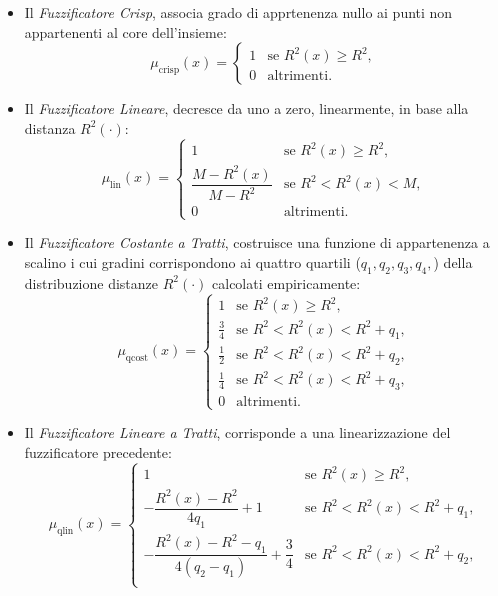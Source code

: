 \documentclass [11pt,a4paper,twoside,openright] {book}
\begin{document}
\begin{itemize}
\item Il \textit{Fuzzificatore Crisp}, associa grado di apprtenenza nullo ai punti non appartenenti al core dell'insieme:
\begin{equation}
\mu_{\mathrm{crisp}}(x)=
\begin{cases}
1 & \text{se } R^2(x) \geq R^2, \\
0 & \text{altrimenti}.
\end{cases}
\end{equation}
\item Il \textit{Fuzzificatore Lineare}, decresce da uno a zero, linearmente, in base alla distanza $R^2(\cdot)$:
\begin{equation}
\mu_{\mathrm{lin}}(x)=
\begin{cases}
1 & \text{se } R^2(x) \geq R^2, \\
\dfrac{M-R^2(x)}{M-R^2} & \text{se } R^2 <  R^2(x) < M, \\
0 & \text{altrimenti}.
\end{cases}
\end{equation}
\item Il \textit{Fuzzificatore Costante a Tratti}, costruisce una funzione di appartenenza a scalino i cui gradini corrispondono ai quattro quartili ($q_1, q_2, q_3, q_4,$) della distribuzione distanze $R^2(\cdot)$ calcolati empiricamente:
\begin{equation}
\mu_{\mathrm{qcost}}(x)=
\begin{cases}
1 & \text{se } R^2(x) \geq R^2, \\
\frac{3}{4} & \text{se } R^2 < R^2(x) < R^2 + q_1, \\
\frac{1}{2} & \text{se } R^2 < R^2(x) < R^2 + q_2, \\
\frac{1}{4} & \text{se } R^2 < R^2(x) < R^2 + q_3, \\
0 & \text{altrimenti}.
\end{cases}
\end{equation}
\item Il \textit{Fuzzificatore Lineare a Tratti}, corrisponde a una linearizzazione del fuzzificatore precedente:
\begin{equation}
\mu_{\mathrm{qlin}}(x)=
\begin{cases}
1 & \text{se } R^2(x) \geq R^2, \\
-\dfrac{R^2(x)-R^2}{4q_1} +1 & \text{se } R^2 < R^2(x) < R^2 + q_1, \\
-\dfrac{R^2(x)-R^2-q_1}{4(q_2-q_1)} +\dfrac{3}{4} & \text{se } R^2 < R^2(x) < R^2 + q_2, \\

\end{cases}
\end{equation}
\end{itemize}
\end{document}
